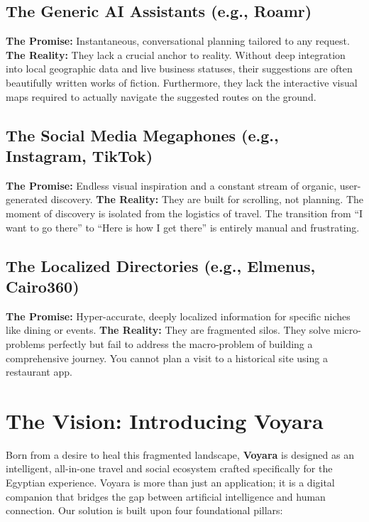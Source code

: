 \subsection{The Generic AI Assistants (e.g., Roamr)}
\textbf{The Promise:} Instantaneous, conversational planning tailored to any request.
\textbf{The Reality:} They lack a crucial anchor to reality. Without deep integration into local geographic data and live business statuses, their suggestions are often beautifully written works of fiction. Furthermore, they lack the interactive visual maps required to actually navigate the suggested routes on the ground.

\subsection{The Social Media Megaphones (e.g., Instagram, TikTok)}
\textbf{The Promise:} Endless visual inspiration and a constant stream of organic, user-generated discovery.
\textbf{The Reality:} They are built for scrolling, not planning. The moment of discovery is isolated from the logistics of travel. The transition from ``I want to go there'' to ``Here is how I get there'' is entirely manual and frustrating.

\subsection{The Localized Directories (e.g., Elmenus, Cairo360)}
\textbf{The Promise:} Hyper-accurate, deeply localized information for specific niches like dining or events.
\textbf{The Reality:} They are fragmented silos. They solve micro-problems perfectly but fail to address the macro-problem of building a comprehensive journey. You cannot plan a visit to a historical site using a restaurant app.

\section{The Vision: Introducing Voyara}
Born from a desire to heal this fragmented landscape, \textbf{Voyara} is designed as an intelligent, all-in-one travel and social ecosystem crafted specifically for the Egyptian experience. Voyara is more than just an application; it is a digital companion that bridges the gap between artificial intelligence and human connection. Our solution is built upon four foundational pillars:

